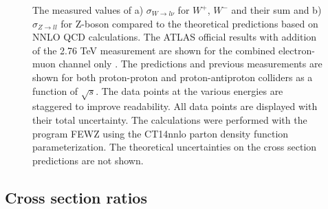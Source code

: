 \begin{figure}[!h]
\begin{minipage}[h]{1.0\linewidth}
\end{minipage}
\vfill
\begin{minipage}[h]{1.0\linewidth}
\end{minipage}
\caption{The measured values of a) $\sigma_{W \to l\nu}$ for $W^+$, $W^-$ and  their sum and b) $\sigma_{Z \to ll}$ for Z-boson compared to the theoretical predictions based on NNLO QCD calculations. The ATLAS official results with addition of the 2.76 TeV measurement are shown for the combined electron-muon channel only . The predictions and previous measurements are shown for both proton-proton and proton-antiproton colliders as a function of $\sqrt{s}$. The data points at the various energies are staggered to improve readability. All data points are displayed with their total uncertainty. The calculations were performed with the program FEWZ using the CT14nnlo parton density function parameterization. The theoretical uncertainties on the cross section predictions are not shown.}
\label{fig:ZcsResults}
\end{figure}


\subsection{Cross section ratios}

